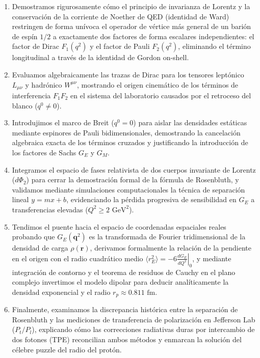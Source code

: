 \documentclass[10pt,a4paper]{article}
\begin{document}
\begin{enumerate}
    \item Demostramos rigurosamente cómo el principio de invarianza de Lorentz y la conservación de la corriente de Noether de QED (identidad de Ward) restringen de forma unívoca el operador de vértice más general de un barión de espín $1/2$ a exactamente dos factores de forma escalares independientes: el factor de Dirac $F_1(q^2)$ y el factor de Pauli $F_2(q^2)$, eliminando el término longitudinal a través de la identidad de Gordon on-shell.
    \item Evaluamos algebraicamente las trazas de Dirac para los tensores leptónico $L_{\mu\nu}$ y hadrónico $W^{\mu\nu}$, mostrando el origen cinemático de los términos de interferencia $F_1 F_2$ en el sistema del laboratorio causados por el retroceso del blanco ($q^0 \neq 0$).
    \item Introdujimos el marco de Breit ($q^0 = 0$) para aislar las densidades estáticas mediante espinores de Pauli bidimensionales, demostrando la cancelación algebraica exacta de los términos cruzados y justificando la introducción de los factores de Sachs $G_E$ y $G_M$.
    \item Integramos el espacio de fases relativista de dos cuerpos invariante de Lorentz ($d\Phi_2$) para cerrar la demostración formal de la fórmula de Rosenbluth, y validamos mediante simulaciones computacionales la técnica de separación lineal $y = mx + b$, evidenciando la pérdida progresiva de sensibilidad en $G_E$ a transferencias elevadas ($Q^2 \ge 2\text{ GeV}^2$).
    \item Tendimos el puente hacia el espacio de coordenadas espaciales reales probando que $G_E(\mathbf{q}^2)$ es la transformada de Fourier tridimensional de la densidad de carga $\rho(\mathbf{r})$, derivamos formalmente la relación de la pendiente en el origen con el radio cuadrático medio $\langle r_E^2 \rangle = -6 \left.\frac{dG_E}{dQ^2}\right|_0$, y mediante integración de contorno y el teorema de residuos de Cauchy en el plano complejo invertimos el modelo dipolar para deducir analíticamente la densidad exponencial y el radio $r_p \approx 0.811\text{ fm}$.
    \item Finalmente, examinamos la discrepancia histórica entre la separación de Rosenbluth y las mediciones de transferencia de polarización en Jefferson Lab ($P_t/P_l$), explicando cómo las correcciones radiativas duras por intercambio de dos fotones (TPE) reconcilian ambos métodos y enmarcan la solución del célebre puzzle del radio del protón.
\end{enumerate}
\end{document}
